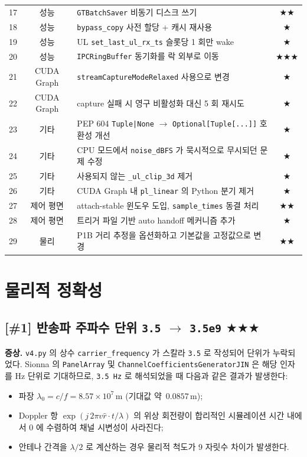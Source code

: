 \documentclass[11pt,a4paper]{article}
\newcommand{\sone}{\textcolor{starcolor}{$\bigstar$}}
\newcommand{\stwo}{\textcolor{starcolor}{$\bigstar\bigstar$}}
\newcommand{\sthree}{\textcolor{starcolor}{$\bigstar\bigstar\bigstar$}}
\newcommand{\vfour}{\texttt{v4.py}}
\newcommand{\bugitem}[3]{%
  \subsection{[\##1] #2 \hfill #3}%
  \vspace{-0.5em}%
}
\begin{document}
\begin{center}
\begin{longtable}{c c p{8.6cm} c}
17 & 성능 & \texttt{GTBatchSaver} 비동기 디스크 쓰기 & \stwo \\
18 & 성능 & \texttt{bypass\_copy} 사전 할당 + 캐시 재사용 & \sone \\
19 & 성능 & UL \texttt{set\_last\_ul\_rx\_ts} 슬롯당 1 회만 wake & \sone \\
20 & 성능 & \texttt{IPCRingBuffer} 동기화를 락 외부로 이동 & \sthree \\
21 & CUDA Graph & \texttt{streamCaptureModeRelaxed} 사용으로 변경 & \sone \\
22 & CUDA Graph & capture 실패 시 영구 비활성화 대신 5 회 재시도 & \sone \\
23 & 기타 & PEP 604 \texttt{Tuple|None} $\to$ \texttt{Optional[Tuple[...]]} 호환성 개선 & \sone \\
24 & 기타 & CPU 모드에서 \texttt{noise\_dBFS} 가 묵시적으로 무시되던 문제 수정 & \sone \\
25 & 기타 & 사용되지 않는 \texttt{\_ul\_clip\_3d} 제거 & \sone \\
26 & 기타 & CUDA Graph 내 \texttt{pl\_linear} 의 Python 분기 제거 & \sone \\
\midrule
27 & 제어 평면 & attach-stable 윈도우 도입, \texttt{sample\_times} 동결 처리 & \stwo \\
28 & 제어 평면 & 트리거 파일 기반 auto handoff 메커니즘 추가 & \sone \\
29 & 물리 & P1B 거리 추정을 옵션화하고 기본값을 고정값으로 변경 & \stwo \\
\end{longtable}
\end{center}

\section{물리적 정확성}
\label{sec:physics}

\bugitem{1}{반송파 주파수 단위 \texttt{3.5} $\to$ \texttt{3.5e9}}{\sthree}

\textbf{증상.} \vfour{} 의 상수 \texttt{carrier\_frequency} 가 스칼라
\texttt{3.5} 로 작성되어 단위가 누락되었다. Sionna 의 \texttt{PanelArray}
및 \texttt{ChannelCoefficientsGeneratorJIN} 은 해당 인자를 Hz 단위로
기대하므로, \texttt{3.5\,Hz} 로 해석되었을 때 다음과 같은 결과가 발생한다:
\begin{itemize}
  \item 파장 $\lambda_0 = c/f = 8.57\times 10^{7}\,\text{m}$
        (기대값 약 \,$0.0857\,\text{m}$);
  \item Doppler 항 $\exp(j\,2\pi v \hat{r}\cdot t / \lambda)$ 의 위상 회전량이
        합리적인 시뮬레이션 시간 내에서 0 에 수렴하여 채널 시변성이 사라진다;
  \item 안테나 간격을 $\lambda/2$ 로 계산하는 경우 물리적 척도가 9 자릿수
        차이가 발생한다.
\end{itemize}
\end{document}
